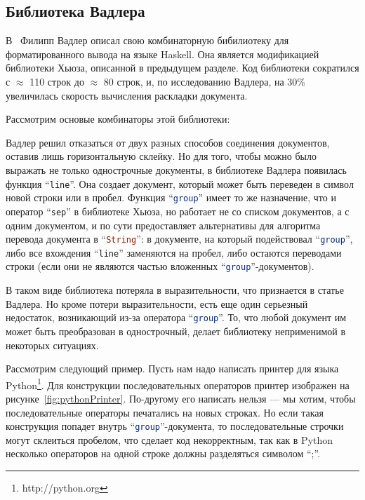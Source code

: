 \subsection{Библиотека Вадлера}

В~\cite{wadler} Филипп Вадлер описал свою комбинаторную бибилиотеку для форматированного вывода на языке Haskell. Она является модификацией библиотеки Хьюза, описанной в предыдущем разделе. Код библиотеки сократился с $\approx$ 110 строк до $\approx$ 80 строк, и, по исследованию Вадлера, на 30\% увеличилась скорость вычисления раскладки документа.

Рассмотрим основые комбинаторы этой библиотеки:


Вадлер решил отказаться от двух разных способов соединения документов, оставив лишь горизонтальную склейку. Но для того, чтобы можно было выражать не только однострочные документы, в библиотеке Вадлера появилась функция “\lstinline[language=Haskell]{line}”. Она создает документ, который может быть переведен в символ новой строки или в пробел.
Функция “\lstinline[language=Haskell]{group}” имеет то же назначение, что и оператор “\lstinline[language=Haskell]{sep}” в библиотеке Хьюза, но работает не со списком документов, а с одним документом, и по сути предоставляет альтернативы для алгоритма перевода документа в “\lstinline[language=Haskell]{String}”: в документе, на который подействовал “\lstinline[language=Haskell]{group}”, либо все вхождения “\lstinline[language=Haskell]{line}” заменяются на пробел, либо остаются переводами строки (если они не являются частью вложенных “\lstinline[language=Haskell]{group}”-документов).

В таком виде библиотека потеряла в выразительности, что признается в статье Вадлера. Но кроме потери выразительности, есть еще один серьезный недостаток, возникающий из-за оператора “\lstinline[language=Haskell]{group}”. То, что любой документ им может быть преобразован в однострочный, делает библиотеку неприменимой в некоторых ситуациях. 

Рассмотрим следующий пример. Пусть нам надо написать принтер для языка Python\footnote{http://python.org}. Для конструкции последовательных операторов принтер изображен на рисунке~\ref{fig:pythonPrinter}.
По-другому его написать нельзя --- мы хотим, чтобы последовательные операторы печатались на новых строках. Но если такая конструкция попадет внутрь “\lstinline[language=Haskell]{group}”-документа, то последовательные строчки могут склеиться пробелом, что сделает код некорректным, так как в Python несколько операторов на одной строке должны разделяться символом “;”.

